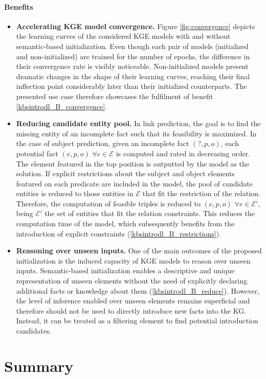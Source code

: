 \paragraph{Benefits}
\begin{itemize}
    \item \textbf{Accelerating KGE model convergence.} Figure \ref{fig:convergence} depicts the learning curves of the considered KGE models with and without semantic-based initialization. Even though each pair of models (initialized and non-initialized) are trained for the number of epochs, the difference in their convergence rate is visibly noticeable. Non-initialized models present dramatic changes in the shape of their learning curves, reaching their final inflection point considerably later than their initialized counterparts. The presented use case therefore showcases the fulfilment of benefit \ref{kbsintrodl_B_convergence}.
    
    \item \textbf{Reducing candidate entity pool.} In link prediction, the goal is to find the missing entity of an incomplete fact such that its feasibility is maximized. In the case of subject prediction, given an incomplete fact $(?,p,o)$, each potential fact $(e,p,o)$ $\forall e \in \mathcal{E}$ is computed and rated in decreasing order. The element featured in the top position is outputted by the model as the solution. If explicit restrictions about the subject and object elements featured on each predicate are included in the model, the pool of candidate entities is reduced to those entities in $\mathcal{E}$ that fit the restriction of the relation. Therefore, the computation of feasible triples is reduced to $(e,p,o)$ $\forall e \in \mathcal{E}'$, being $\mathcal{E}'$ the set of entities that fit the relation constraints. This reduces the computation time of the model, which subsequently benefits from the introduction of explicit constraints (\ref{kbsintrodl_B_restrictions}).
    
    \item \textbf{Reasoning over unseen inputs.} One of the main outcomes of the proposed initialization is the induced capacity of KGE models to reason over unseen inputs. Semantic-based initialization enables a descriptive and unique representation of unseen elements without the need of explicitly declaring additional facts or knowledge about them (\ref{kbsintrodl_B_reduce}). However, the level of inference enabled over unseen elements remains superficial and therefore should not be used to directly introduce new facts into the KG. Instead, it can be treated as a filtering element to find potential introduction candidates.
\end{itemize}


\section{Summary}\label{4_sec:summary}

